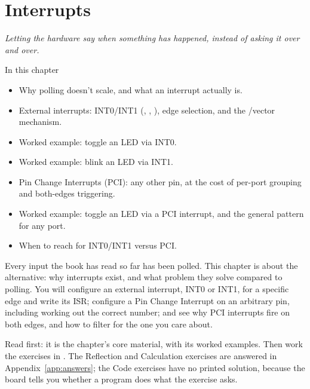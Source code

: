 
\chapter{Interrupts}
\label{c3:ch}

{\large\itshape Letting the hardware say when something has happened, instead of asking it over
and over.\par}

\begin{chapterbox}{In this chapter}
\begin{itemize}
  \item Why polling doesn't scale, and what an interrupt actually is.
  \item External interrupts: INT0/INT1 (, , ), edge selection,
    and the /vector mechanism.
  \item Worked example: toggle an LED via INT0.
  \item Worked example: blink an LED via INT1.
  \item Pin Change Interrupts (PCI): any other pin, at the cost of per-port grouping and
    both-edges triggering.
  \item Worked example: toggle an LED via a PCI interrupt, and the general pattern for any port.
  \item When to reach for INT0/INT1 versus PCI.
\end{itemize}
\end{chapterbox}

Every input the book has read so far has been polled. This chapter is about the alternative: why
interrupts exist, and what problem they solve compared to polling. You will configure an external
interrupt, INT0 or INT1, for a specific edge and write its ISR; configure a Pin Change Interrupt on
an arbitrary pin, including working out the correct  number; and see why PCI
interrupts fire on both edges, and how to filter for the one you care about.

Read  first: it is the chapter's core material, with its worked
examples. Then work the exercises in . The Reflection and Calculation
exercises are answered in Appendix~\ref{app:answers}; the Code exercises have no printed solution,
because the board tells you whether a program does what the exercise asks.




